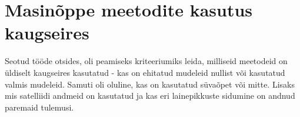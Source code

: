 \section{Masinõppe meetodite kasutus kaugseires}
Seotud tööde otsides, oli peamiseks kriteeriumiks leida, milliseid meetodeid on
üldiselt kaugseires kasutatud - kas on ehitatud mudeleid nullist või kasutatud
valmis mudeleid. Samuti oli oluline, kas on kasutatud süvaõpet või mitte. Lisaks mis satelliidi andmeid on kasutatud ja kas eri lainepikkuste sidumine on andnud paremaid tulemusi.

